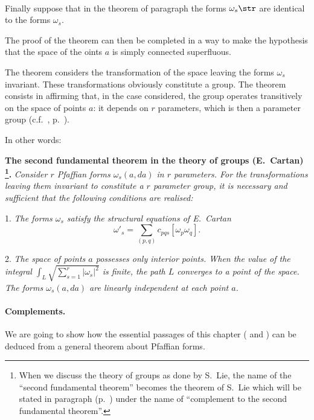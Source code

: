 \paragraph{}
\label{sec:165}
Finally suppose that in the theorem of paragraph  the forms $\omega_{s}\str$ are identical to the forms $\omega_{s}$.

The proof of the theorem can then be completed in a way to make the hypothesis that the space of the oints $a$ is simply connected superfluous.

The theorem considers the transformation of the space leaving the forms $\omega_{s}$ invariant. These transformations obviously constitute a group. The theorem consists in affirming that, in the case considered, the group operates transitively on the space of points $a$: it depends on $r$ parameters, which is then a parameter group (c.f.~, p.~\pageref{sec:83}).

In other words:

\somespace

\textbf{The second fundamental theorem in the theory of groups (E.~Cartan) \footnote{When we discuss the theory of groups as done by S.~Lie, the name of the ``second fundamental theorem'' becomes the theorem of S.~Lie which will be stated in paragraph  (p.~\pageref{sec:211}) under the name of ``complement to the second fundamental theorem''.}.} \emph{Consider $r$ Pfaffian forms $\omega_{s}(a,da)$ in $r$ parameters. For the transformations leaving them invariant to constitute a $r$ parameter group, it is necessary and sufficient that the following conditions are realised:}

\somespace

1. \emph{The forms $\omega_{s}$ satisfy the structural equations of E.~Cartan}
\[
\omega'_{s}=\sum_{(p,q)}c_{pqs}[\omega_{p}\omega_{q}].
\]

2. \emph{The space of points $a$ possesses only interior points. When the value of the integral $\int_{L}\sqrt{\sum_{s=1}^{r}|\omega_{s}|^{2}}$ is finite, the path $L$ converges to a point of the space. The forms $\omega_{s}(a,da)$ are linearly independent at each point $a$.}

\paragraph{Complements.}
\label{sec:166}
We are going to show how the essential passages of this chapter ( and ) can be deduced from a general theorem about Pfaffian forms.

